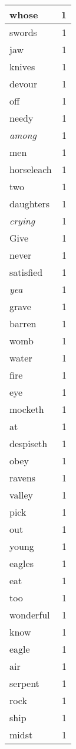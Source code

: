 \begin{center}
\begin{longtable}{l|r}
whose & 1\\ \hline 
swords & 1\\ \hline 
jaw & 1\\ \hline 
knives & 1\\ \hline 
devour & 1\\ \hline 
off & 1\\ \hline 
needy & 1\\ \hline 
\emph{among} & 1\\ \hline 
men & 1\\ \hline 
horseleach & 1\\ \hline 
two & 1\\ \hline 
daughters & 1\\ \hline 
\emph{crying} & 1\\ \hline 
Give & 1\\ \hline 
never & 1\\ \hline 
satisfied & 1\\ \hline 
\emph{yea} & 1\\ \hline 
grave & 1\\ \hline 
barren & 1\\ \hline 
womb & 1\\ \hline 
water & 1\\ \hline 
fire & 1\\ \hline 
eye & 1\\ \hline 
mocketh & 1\\ \hline 
at & 1\\ \hline 
despiseth & 1\\ \hline 
obey & 1\\ \hline 
ravens & 1\\ \hline 
valley & 1\\ \hline 
pick & 1\\ \hline 
out & 1\\ \hline 
young & 1\\ \hline 
eagles & 1\\ \hline 
eat & 1\\ \hline 
too & 1\\ \hline 
wonderful & 1\\ \hline 
know & 1\\ \hline 
eagle & 1\\ \hline 
air & 1\\ \hline 
serpent & 1\\ \hline 
rock & 1\\ \hline 
ship & 1\\ \hline 
midst & 1\\ \hline 

\end{longtable}
\end{center}
